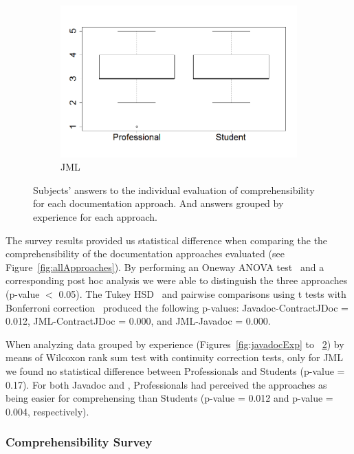 \begin{figure}
\begin{subfigure}{.48\textwidth}
\caption{\contractjdoc{}}
\label{fig:contractjdocExp}
\end{subfigure}
\begin{subfigure}{.48\textwidth}
\includegraphics[width=1\linewidth]{figs/boxplotJMLXExperience.png}
\caption{JML}
\label{fig:jmlExp}
\end{subfigure}
\caption{Subjects' answers to the individual evaluation of comprehensibility for
each documentation approach. And answers grouped by experience for each
approach.}
\label{fig:surveyResults}
\end{figure}

The survey results provided us statistical difference when comparing the the
comprehensibility of the documentation approaches evaluated (see
Figure~\ref{fig:allApproaches}). By performing an Oneway ANOVA test~\cite{statistical} and
a corresponding post hoc analysis we were able to distinguish the three
approaches (p-value $<$ 0.05).
The Tukey HSD~\cite{statistical} and pairwise comparisons using t tests
with Bonferroni correction~\cite{statistical} produced the following p-values:
Javadoc-ContractJDoc = 0.012, JML-ContractJDoc = 0.000, and JML-Javadoc = 0.000.

When analyzing data grouped by experience (Figures~\ref{fig:javadocExp} to
~\ref{fig:jmlExp}) by means of Wilcoxon rank sum test with continuity correction
tests, only for JML we found no statistical difference between Professionals and
Students (p-value = 0.17). For both Javadoc and \contractjdoc{}, Professionals
had perceived the approaches as being easier for comprehensing than Students
(p-value = 0.012 and p-value = 0.004, respectively).

\subsubsection{Comprehensibility Survey}
\label{sec:surveyDiscussion}

